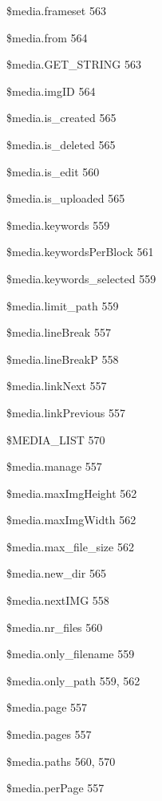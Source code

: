 \documentclass{book}
\renewcommand\subitem{\par}
\begin{document}
\begin{multicols}{2}
\begin{osp-index}
    \subitem \$media.frameset\hspace{1mm} 563
    \subitem \$media.from\hspace{1mm} 564
    \subitem \$media.GET\_STRING\hspace{1mm} 563
    \subitem \$media.imgID\hspace{1mm} 564
    \subitem \$media.is\_created\hspace{1mm} 565
    \subitem \$media.is\_deleted\hspace{1mm} 565
    \subitem \$media.is\_edit\hspace{1mm} 560
    \subitem \$media.is\_uploaded\hspace{1mm} 565
    \subitem \$media.keywords\hspace{1mm} 559
    \subitem \$media.keywordsPerBlock\hspace{1mm} 561
    \subitem \$media.keywords\_selected\hspace{1mm} 559
    \subitem \$media.limit\_path\hspace{1mm} 559
    \subitem \$media.lineBreak\hspace{1mm} 557
    \subitem \$media.lineBreakP\hspace{1mm} 558
    \subitem \$media.linkNext\hspace{1mm} 557
    \subitem \$media.linkPrevious\hspace{1mm} 557
    \subitem \$MEDIA\_LIST\hspace{1mm} 570
    \subitem \$media.manage\hspace{1mm} 557
    \subitem \$media.maxImgHeight\hspace{1mm} 562
    \subitem \$media.maxImgWidth\hspace{1mm} 562
    \subitem \$media.max\_file\_size\hspace{1mm} 562
    \subitem \$media.new\_dir\hspace{1mm} 565
    \subitem \$media.nextIMG\hspace{1mm} 558
    \subitem \$media.nr\_files\hspace{1mm} 560
    \subitem \$media.only\_filename\hspace{1mm} 559
    \subitem \$media.only\_path\hspace{1mm} 559, 562
    \subitem \$media.page\hspace{1mm} 557
    \subitem \$media.pages\hspace{1mm} 557
    \subitem \$media.paths\hspace{1mm} 560, 570
    \subitem \$media.perPage\hspace{1mm} 557

\end{osp-index}
\end{multicols}
\end{document}
